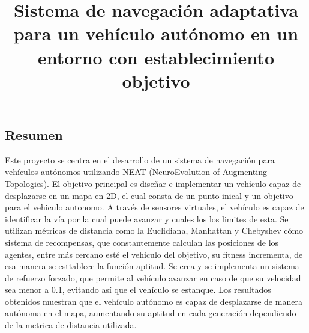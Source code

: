 \documentclass[conference]{IEEEtran}
\begin{document}
\title{Sistema de navegación adaptativa para un vehículo autónomo en un entorno con establecimiento objetivo}

\author{
\and
{}
\and
{}
}

\maketitle

\begin{strip}
\section*{Resumen}
Este proyecto se centra en el desarrollo de un sistema de navegación para vehículos autónomos utilizando NEAT (NeuroEvolution of Augmenting Topologies). El objetivo principal es diseñar e implementar un vehículo capaz de desplazarse en un mapa en 2D, el cual consta de un punto inical y un objetivo para el vehiculo autonomo. A través de sensores virtuales, el vehículo es capaz de identificar la vía por la cual puede avanzar y cuales los los limites de esta. Se utilizan métricas de distancia como la Euclidiana, Manhattan y Chebyshev cómo sistema de recompensas, que constantemente calculan las posiciones de los agentes, entre más cercano esté el vehiculo del objetivo, su fitness incrementa, de esa manera se esttablece la función aptitud. Se crea y se implementa un sistema de refuerzo forzado, que permite al vehículo avanzar en caso de que su velocidad sea menor a 0.1, evitando así que el vehículo se estanque. Los resultados obtenidos muestran que el vehículo autónomo es capaz de desplazarse de manera autónoma en el mapa, aumentando su aptitud en cada generación dependiendo de la metrica de distancia utilizada.
\end{strip}
\end{document}
